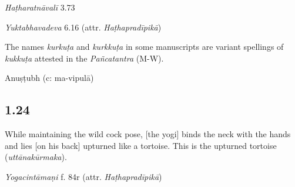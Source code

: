 \begin{ekdosis}
\begin{testimonia}[hp01_023]
\emph{Haṭharatnāvalī} 3.73

\begin{versinnote}
\end{versinnote}

\emph{Yuktabhavadeva} 6.16 (attr. \emph{Haṭhapradīpikā})

\begin{versinnote}
\end{versinnote}


\end{testimonia}

\begin{philcomm}[hp01_023]
The names \emph{kurkuṭa} and \emph{kurkkuṭa} in some manuscripts are variant spellings of \emph{kukkuṭa} attested in the \emph{Pañcatantra} (M-W).
\end{philcomm}

\begin{metre}[hp01_023]
Anuṣṭubh (c: ma-vipulā)
\end{metre}

\subsection*{1.24}
\begin{translation}[hp01_024]
While maintaining the wild cock pose, [the yogi] binds the neck with the hands and lies [on his back] upturned like a tortoise. This is the upturned tortoise (\emph{uttānakūrmaka}).
\end{translation}

\begin{testimonia}[hp01_024]
\emph{Yogacintāmaṇi} f. 84r (attr. \emph{Haṭhapradīpikā})

\begin{versinnote}
\end{versinnote}


\end{testimonia}
\end{ekdosis}
